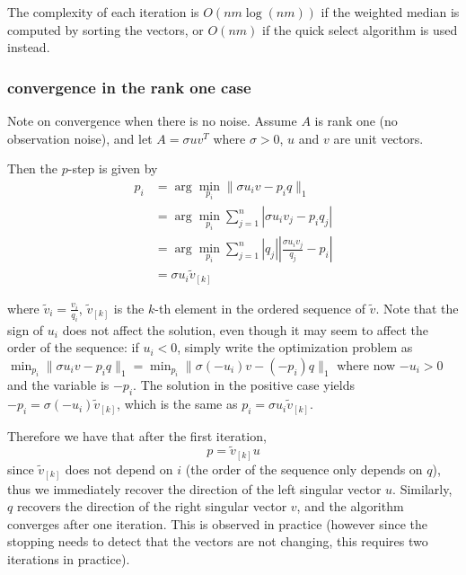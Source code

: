 The complexity of each iteration is $O(nm\log (nm))$ if the weighted median is computed by sorting the vectors, or $O(nm)$ if the quick select algorithm is used instead.


\subsubsection{convergence in the rank one case}
Note on convergence when there is no noise. Assume $A$ is rank one (no observation noise), and let $A = \sigma uv^T$ where $\sigma > 0$, $u$ and $v$ are unit vectors.

Then the $p$-step is given by
\begin{align*}
p_i 
&= \arg \min_{p_i} \|\sigma u_i v - p_iq\|_1 \\
&= \arg \min_{p_i} \sum_{j = 1}^n |\sigma u_i v_j - p_iq_j| \\
&= \arg \min_{p_i} \sum_{j = 1}^n |q_j| \left| \frac{\sigma u_i v_j}{q_j} - p_i \right| \\
&= \sigma u_i \tilde{v}_{[k]}
\end{align*}

where $\tilde{v}_i = \frac{v_i}{q_i}$, $\tilde{v}_{[k]}$ is the $k$-th element in the ordered sequence of $\tilde{v}$. Note that the sign of $u_i$ does not affect the solution, even though it may seem to affect the order of the sequence: if $u_i < 0$, simply write the optimization problem as $\min_{p_i} \|\sigma u_i v - p_iq\|_1 = \min_{p_i} \|\sigma (-u_i) v - (-p_i)q\|_1$ where now $-u_i > 0$ and the variable is $-p_i$. The solution in the positive case yields  $-p_i = \sigma (-u_i) \tilde{v}_{[k]}$, which is the same as $ p_i = \sigma u_i \tilde{v}_{[k]}$.

Therefore we have that after the first iteration, 
\[
p = \tilde{v}_{[k]} u
\]
since $\tilde{v}_{[k]}$ does not depend on $i$ (the order of the sequence only depends on $q$), thus we immediately recover the direction of the left singular vector $u$. Similarly, $q$ recovers the direction of the right singular vector $v$, and the algorithm converges after one iteration. This is observed in practice (however since the stopping needs to detect that the vectors are not changing, this requires two iterations in practice).



